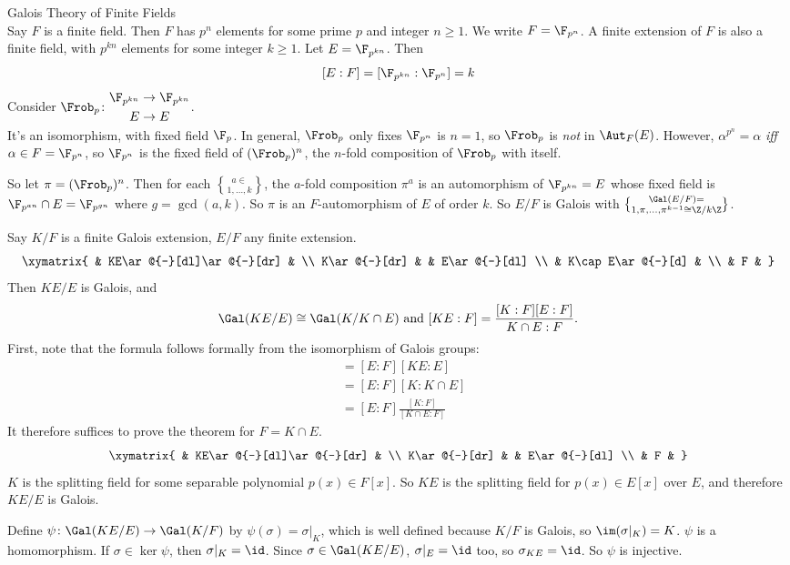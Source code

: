 Galois Theory of Finite Fields \\
Say $F$ is a finite field.  Then $F$ has $p^n$ elements for some prime $p$ and integer $n\geq1$.  We write $F=\F_{p^n}$.  A finite extension of $F$ is also a finite field, with $p^{kn}$ elements for some integer $k\geq1$.  Let $E=\F_{p^{kn}}$.  Then
\[ [E:F] = [\F_{p^{kn}}:\F_{p^n}] = k \]
Consider $\Frob_p\colon\begin{aligned}\F_{p^{kn}}&\to\F_{p^{kn}}\\E&\to E\end{aligned}$. \\
It's an isomorphism, with fixed field $\F_p$.  In general, $\Frob_p$ only fixes $\F_{p^n}$ is $n=1$, so $\Frob_p$ is \emph{not} in $\Aut_F(E)$.  However, $\alpha^{p^n}=\alpha$ \emph{iff} $\alpha\in F=\F_{p^n}$, so $\F_{p^n}$ is the fixed field of $(\Frob_p)^n$, the $n$-fold composition of $\Frob_p$ with itself.

So let $\pi=(\Frob_p)^n$.  Then for each $a\in\brace{1,\dotsc,k}$, the $a$-fold composition $\pi^a$ is an automorphism of $\F_{p^{kn}}=E$ whose fixed field is $\F_{p^{an}}\cap E=\F_{p^{gn}}$ where $g=\gcd(a,k)$.  So $\pi$ is an $F$-automorphism of $E$ of order $k$.  So $E/F$ is Galois with $\Gal(E/F)=\brace{1,\pi,\dotsc,\pi^{k-1}}\cong\Z/k\Z$.

\thm Say $K/F$ is a finite Galois extension, $E/F$ any finite extension.
\[ \xymatrix{
& KE\ar@{-}[dl]\ar@{-}[dr] & \\
K\ar@{-}[dr] & & E\ar@{-}[dl] \\
& K\cap E\ar@{-}[d] & \\
& F &
} \]
Then $KE/E$ is Galois, and
\[ \Gal(KE/E)\cong\Gal(K/K\cap E) \text{ and } [KE:F] = \frac{[K:F][E:F]}{K\cap E:F} . \]
\pf First, note that the formula follows formally from the isomorphism of Galois groups:
\begin{align*}
[KE:F] &= [E:F][KE:E] \\
&= [E:F][K:K\cap E] \\
&= [E:F]\frac{[K:F]}{[K\cap E:F]}
\end{align*}
It therefore suffices to prove the theorem for $F=K\cap E$.
\[ \xymatrix{
& KE\ar@{-}[dl]\ar@{-}[dr] & \\
K\ar@{-}[dr] & & E\ar@{-}[dl] \\
& F &
} \]
$K$ is the splitting field for some separable polynomial $p(x)\in F[x]$.  So $KE$ is the splitting field for $p(x)\in E[x]$ over $E$, and therefore $KE/E$ is Galois.

Define $\psi\colon\Gal(KE/E)\to\Gal(K/F)$ by $\psi(\sigma)=\sigma|_K$, which is well defined because $K/F$ is Galois, so $\im(\sigma|_K)=K$.  $\psi$ is a homomorphism.  If $\sigma\in\ker\psi$, then $\sigma|_K=\id$.  Since $\sigma\in\Gal(KE/E)$, $\sigma|_E=\id$ too, so $\sigma_{KE}=\id$.  So $\psi$ is injective.

